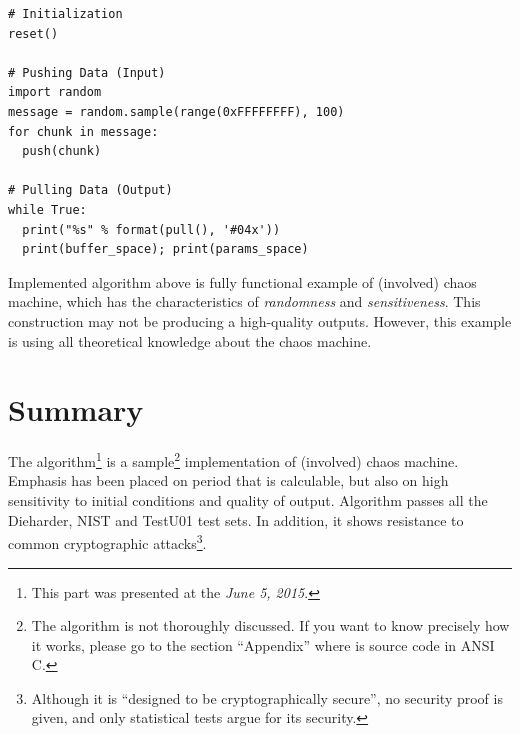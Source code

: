 \documentclass[twocolumn, a4paper, 10pt]{article}
\begin{document}
\begin{lstlisting}[style=codeAppendix, numbers=none]
# Initialization
reset()

# Pushing Data (Input)
import random
message = random.sample(range(0xFFFFFFFF), 100)
for chunk in message:
  push(chunk)

# Pulling Data (Output)
while True:
  print("%s" % format(pull(), '#04x'))
  print(buffer_space); print(params_space)
\end{lstlisting}

Implemented algorithm above is fully functional example of (involved) chaos machine, which has the characteristics of \textit{randomness} and \textit{sensitiveness}. This construction may not be producing a high-quality outputs. However, this example is using all theoretical knowledge about the chaos machine.




\section{Summary}

The algorithm\footnote{This part was presented at the \textit{June 5, 2015}.} is a sample\footnote{The algorithm is not thoroughly discussed. If you want to know precisely how it works, please go to the section ``Appendix'' where is source code in ANSI C.} implementation of (involved) chaos machine. Emphasis has been placed on period that is calculable, but also on high sensitivity to initial conditions and quality of output. Algorithm passes all the Dieharder, NIST and TestU01 test sets. In addition, it shows resistance to common cryptographic attacks\footnote{Although it is ``designed to be cryptographically secure'', no security proof is given, and only statistical tests argue for its security.}.
\end{document}
